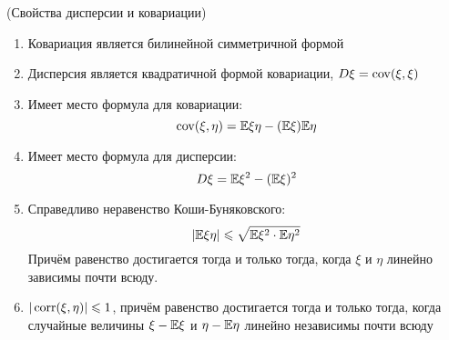 \begin{lemma} (Свойства дисперсии и ковариации)
	\begin{enumerate}
		\item Ковариация является билинейной симметричной формой
		
		\item Дисперсия является квадратичной формой ковариации, $D\xi = \operatorname{cov}(\xi, \xi)$
		
		\item Имеет место формула для ковариации:
		\[
			\operatorname{cov}(\xi, \eta) = \mathbb{E}\xi\eta - (\mathbb{E}\xi)\mathbb{E}\eta
		\]
		
		\item Имеет место формула для дисперсии:
		\[
			D\xi = \mathbb{E}\xi^2 - (\mathbb{E}\xi)^2
		\]
		
		\item Справедливо неравенство Коши-Буняковского:
		\[
			|\mathbb{E}\xi\eta| \leqslant \sqrt{\mathbb{E}\xi^2 \cdot \mathbb{E}\eta^2}
		\]
		Причём равенство достигается тогда и только тогда, когда $\xi$ и $\eta$ линейно зависимы почти всюду.
		
		\item $|\operatorname{corr}(\xi, \eta)| \leqslant 1$, причём равенство достигается тогда и только тогда, когда случайные величины $\xi - \mathbb{E}\xi$ и $\eta - \mathbb{E}\eta$ линейно независимы почти всюду
	\end{enumerate}
\end{lemma}

